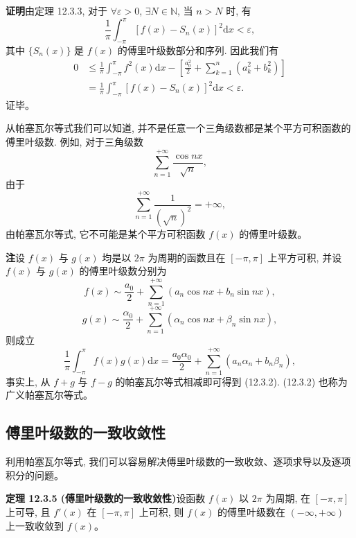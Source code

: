 \documentclass[UTF8,12pt,a4paper,fontset=fandol]{ctexart}
\begin{document}
\noindent\textbf{证明}\quad 由定理 12.3.3, 对于 $\forall\varepsilon>0$, $\exists N\in\mathbb N$, 当 $n>N$ 时, 有
\[
  \frac1\pi\int_{-\pi}^{\pi}[f(x)-S_n(x)]^2\mathrm dx<\varepsilon,
\]
其中 $\{S_n(x)\}$ 是 $f(x)$ 的傅里叶级数部分和序列. 因此我们有
\[
\begin{aligned}
  0
  &\leqslant\frac1\pi\int_{-\pi}^{\pi}f^2(x)\mathrm dx
  -\left[\frac{a_0^2}{2}+\sum_{k=1}^n(a_k^2+b_k^2)\right]\\
  &=\frac1\pi\int_{-\pi}^{\pi}[f(x)-S_n(x)]^2\mathrm dx
  <\varepsilon.
\end{aligned}
\]
证毕。

从帕塞瓦尔等式我们可以知道, 并不是任意一个三角级数都是某个平方可积函数的傅里叶级数. 例如, 对于三角级数
\[
  \sum_{n=1}^{+\infty}\frac{\cos nx}{\sqrt n},
\]
由于
\[
  \sum_{n=1}^{+\infty}\frac1{(\sqrt n)^2}=+\infty,
\]
由帕塞瓦尔等式, 它不可能是某个平方可积函数 $f(x)$ 的傅里叶级数。

\noindent\textbf{注}\quad 设 $f(x)$ 与 $g(x)$ 均是以 $2\pi$ 为周期的函数且在 $[-\pi,\pi]$ 上平方可积, 并设 $f(x)$ 与 $g(x)$ 的傅里叶级数分别为
\[
  f(x)\sim\frac{a_0}{2}+\sum_{n=1}^{+\infty}(a_n\cos nx+b_n\sin nx),
\]
\[
  g(x)\sim\frac{\alpha_0}{2}+\sum_{n=1}^{+\infty}(\alpha_n\cos nx+\beta_n\sin nx),
\]
则成立
\begin{equation}
  \frac1\pi\int_{-\pi}^{\pi}f(x)g(x)\mathrm dx
  =
  \frac{a_0\alpha_0}{2}+\sum_{n=1}^{+\infty}(a_n\alpha_n+b_n\beta_n),
  \tag{12.3.2}
\end{equation}
事实上, 从 $f+g$ 与 $f-g$ 的帕塞瓦尔等式相减即可得到 (12.3.2). (12.3.2) 也称为广义帕塞瓦尔等式。

\subsection{傅里叶级数的一致收敛性}

利用帕塞瓦尔等式, 我们可以容易解决傅里叶级数的一致收敛、逐项求导以及逐项积分的问题。

\noindent\textbf{定理 12.3.5 (傅里叶级数的一致收敛性)}\quad 设函数 $f(x)$ 以 $2\pi$ 为周期, 在 $[-\pi,\pi]$ 上可导, 且 $f'(x)$ 在 $[-\pi,\pi]$ 上可积, 则 $f(x)$ 的傅里叶级数在 $(-\infty,+\infty)$ 上一致收敛到 $f(x)$。
\end{document}
